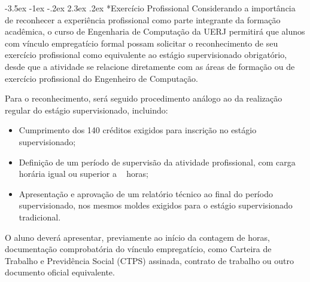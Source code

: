 \documentclass[12pt,a4paper]{article}
\makeatletter
\renewcommand{\section}{\@startsection{section}{1}{\z@}%
      {-3.5ex \@plus -1ex \@minus -.2ex}%
      {2.3ex \@plus.2ex}%
      {\normalfont\normalsize\bfseries}}
\makeatother
\begin{document}
\section*{Exercício Profissional}
Considerando a importância de reconhecer a experiência profissional como parte integrante da formação acadêmica, o curso de Engenharia de Computação da UERJ permitirá que alunos com vínculo empregatício formal possam solicitar o reconhecimento de seu exercício profissional como equivalente ao estágio supervisionado obrigatório, desde que a atividade se relacione diretamente com as áreas de formação ou de exercício profissional do Engenheiro de Computação.

Para o reconhecimento, será seguido procedimento análogo ao da realização regular do estágio supervisionado, incluindo:

\begin{itemize}
  \item Cumprimento dos 140 créditos exigidos para inscrição no estágio supervisionado;
  \item Definição de um período de supervisão da atividade profissional, com carga horária igual ou superior a \EstSupCH~ horas;
  \item Apresentação e aprovação de um relatório técnico ao final do período supervisionado, nos mesmos moldes exigidos para o estágio supervisionado tradicional. \end{itemize}

O aluno deverá apresentar, previamente ao início da contagem de horas, documentação comprobatória do vínculo empregatício, como Carteira de Trabalho e Previdência Social (CTPS) assinada, contrato de trabalho ou outro documento oficial equivalente.
\end{document}
